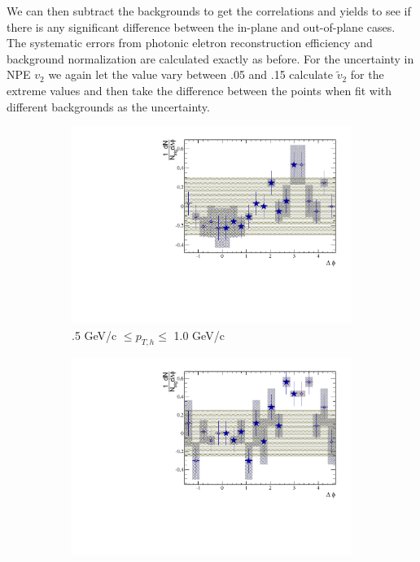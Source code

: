 We can then subtract the backgrounds to get the correlations and yields to see if there is any significant difference between the in-plane and out-of-plane cases. The systematic errors from photonic eletron reconstruction efficiency and background normalization are calculated exactly as before. For the uncertainty in NPE $v_2$ we again let the value vary between .05 and .15 calculate $\widetilde{v}_{2}$ for the extreme values and then take the difference between the points when fit with different backgrounds as the uncertainty.

\begin{figure}[htbp]
	\begin{subfigure}{0.5\textwidth}
		\includegraphics[width=\textwidth]{Plots/Correlations/EP/subtracted/NPE_subtracted_eh_corr_inplane_primpt_4_5_cent_2_5_assopt_1_1.pdf}
		\caption{.5 GeV/c $\leq p_{T,h} \leq$ 1.0 GeV/c}
		\label{fig:EP_corr_subtracted_a}
	\end{subfigure}	
	\begin{subfigure}{0.5\textwidth}
		\includegraphics[width=\textwidth]{Plots/Correlations/EP/subtracted/NPE_subtracted_eh_corr_outplane_primpt_4_5_cent_2_5_assopt_1_1.pdf}

\end{subfigure}
\end{figure}
